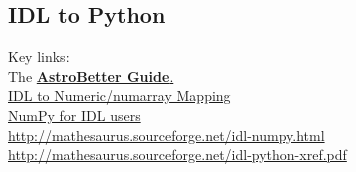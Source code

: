 \documentclass[11pt,a4paper]{article}
\begin{document}
\newpage
\appendix
\begin{appendices}
  \section{IDL to Python}
Key links:\\
The \href{http://www.astrobetter.com/wiki/Python+Switchers+Guide}{{\bf AstroBetter Guide}.} \\
\href{http://www.johnny-lin.com/cdat_tips/tips_array/idl2num.html}{IDL to Numeric/numarray Mapping}\\
\href{http://www.astro.umd.edu/~mbk/idl-numpy.html}{NumPy for IDL users}\\
\href{http://mathesaurus.sourceforge.net/idl-numpy.html}{http://mathesaurus.sourceforge.net/idl-numpy.html}\\
\href{http://mathesaurus.sourceforge.net/idl-python-xref.pdf}{http://mathesaurus.sourceforge.net/idl-python-xref.pdf}\\



\end{appendices}
\end{document}

